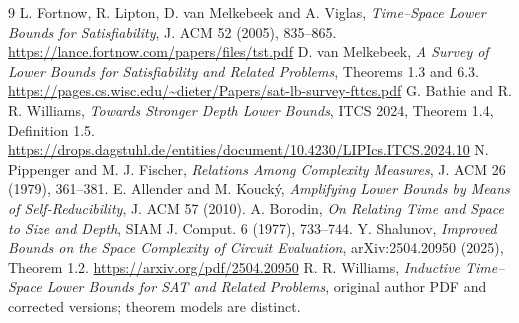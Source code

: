 \documentclass[11pt]{article}
\begin{document}
\begin{thebibliography}{9}
 L. Fortnow, R. Lipton, D. van Melkebeek and A. Viglas, \emph{Time--Space Lower Bounds for Satisfiability}, J. ACM 52 (2005), 835--865. \url{https://lance.fortnow.com/papers/files/tst.pdf}
 D. van Melkebeek, \emph{A Survey of Lower Bounds for Satisfiability and Related Problems}, Theorems 1.3 and 6.3. \url{https://pages.cs.wisc.edu/~dieter/Papers/sat-lb-survey-fttcs.pdf}
 G. Bathie and R. R. Williams, \emph{Towards Stronger Depth Lower Bounds}, ITCS 2024, Theorem 1.4, Definition 1.5. \url{https://drops.dagstuhl.de/entities/document/10.4230/LIPIcs.ITCS.2024.10}
 N. Pippenger and M. J. Fischer, \emph{Relations Among Complexity Measures}, J. ACM 26 (1979), 361--381.
 E. Allender and M. Kouck\'y, \emph{Amplifying Lower Bounds by Means of Self-Reducibility}, J. ACM 57 (2010).
 A. Borodin, \emph{On Relating Time and Space to Size and Depth}, SIAM J. Comput. 6 (1977), 733--744.
 Y. Shalunov, \emph{Improved Bounds on the Space Complexity of Circuit Evaluation}, arXiv:2504.20950 (2025), Theorem 1.2. \url{https://arxiv.org/pdf/2504.20950}
 R. R. Williams, \emph{Inductive Time--Space Lower Bounds for SAT and Related Problems}, original author PDF and corrected versions; theorem models are distinct.
\end{thebibliography}
\end{document}
